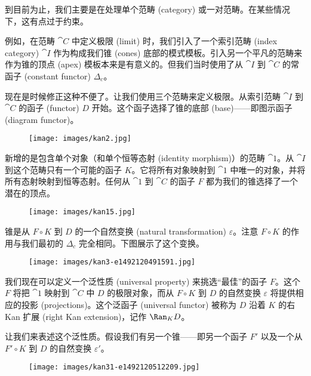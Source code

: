 
\lettrine[lhang=0.17]{到}{目前为止，我们}主要是在处理单个范畴 (category) 或一对范畴。在某些情况下，这有点过于约束。

例如，在范畴 $\cat{C}$ 中定义极限 (limit) 时，我们引入了一个索引范畴 (index category) $\cat{I}$ 作为构成我们锥 (cones) 底部的模式模板。引入另一个平凡的范畴来作为锥的顶点 (apex) 模板本来是有意义的。但我们当时使用了从 $\cat{I}$ 到 $\cat{C}$ 的常函子 (constant functor) $\Delta_c$。

现在是时候修正这种不便了。让我们使用三个范畴来定义极限。从索引范畴 $\cat{I}$ 到 $\cat{C}$ 的函子 (functor) $D$ 开始。这个函子选择了锥的底部 (base)——即图示函子 (diagram functor)。

\begin{figure}[H]
  \centering
  \texttt{[image: images/kan2.jpg]}
\end{figure}

\noindent
新增的是包含单个对象（和单个恒等态射 (identity morphism)）的范畴 $\cat{1}$。从 $\cat{I}$ 到这个范畴只有一个可能的函子 $K$。它将所有对象映射到 $\cat{1}$ 中唯一的对象，并将所有态射映射到恒等态射。任何从 $\cat{1}$ 到 $\cat{C}$ 的函子 $F$ 都为我们的锥选择了一个潜在的顶点。

\begin{figure}[H]
  \centering
  \texttt{[image: images/kan15.jpg]}
\end{figure}

\noindent
锥是从 $F \circ K$ 到 $D$ 的一个自然变换 (natural transformation) $\varepsilon$。注意 $F \circ K$ 的作用与我们最初的 $\Delta_c$ 完全相同。下图展示了这个变换。

\begin{figure}[H]
  \centering
  \texttt{[image: images/kan3-e1492120491591.jpg]}
\end{figure}

\noindent
我们现在可以定义一个泛性质 (universal property) 来挑选“最佳”的函子 $F$。这个 $F$ 将把 $\cat{1}$ 映射到 $\cat{C}$ 中 $D$ 的极限对象，而从 $F \circ K$ 到 $D$ 的自然变换 $\varepsilon$ 将提供相应的投影 (projections)。这个泛函子 (universal functor) 被称为 $D$ 沿着 $K$ 的右 Kan 扩展 (right Kan extension)，记作 $\Ran_{K}D$。

让我们来表述这个泛性质。假设我们有另一个锥——即另一个函子 $F'$ 以及一个从 $F' \circ K$ 到 $D$ 的自然变换 $\varepsilon'$。

\begin{figure}[H]
  \centering
  \texttt{[image: images/kan31-e1492120512209.jpg]}
\end{figure}


